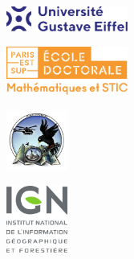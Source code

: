 \begin{titlepage}
  \centering

  \begin{minipage}[t][3.5cm][t]{.95\textwidth}
    \hspace{.1cm}
    \begin{minipage}[c]{4cm}
      \centering
      \includegraphics[width=4cm]{./figures/Logo_Univ.pdf}
    \end{minipage}
    \hfill
    \begin{minipage}[c]{4cm}
      \centering
      \includegraphics[width=4cm]{./figures/Logo_mstic.pdf}
    \end{minipage}
    \hfill
    \begin{minipage}[c]{2cm}
      \centering
      \includegraphics[width=2cm]{./figures/logo-choucas.png}
    \end{minipage}
    \hfill
    \begin{minipage}[c]{2cm}
      \centering
      \includegraphics[width=2cm]{./figures/Logo_ign.pdf}

\end{minipage}
\end{minipage}
\end{titlepage}
